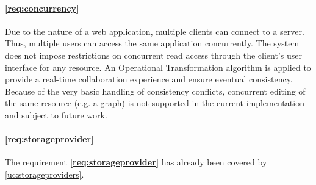 \paragraph{\ref{req:concurrency}} Due to the nature of a web application, multiple clients can connect to a server. Thus, multiple users can access the same application concurrently. The system does not impose restrictions on concurrent read access through the client's user interface for any resource. An Operational Transformation algorithm is applied to provide a real-time collaboration experience and ensure eventual consistency. Because of the very basic handling of consistency conflicts, concurrent editing of the same resource (e.g. a graph) is not supported in the current implementation and subject to future work.

\paragraph{\ref{req:storageprovider}} The requirement \textbf{\ref{req:storageprovider}} has already been covered by \ref{uc:storageproviders}.
